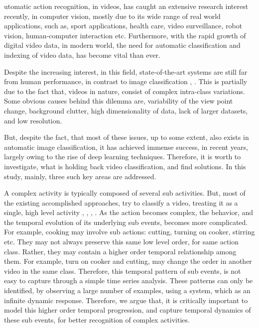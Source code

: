  utomatic action recognition, in videos, has caught an extensive research interest recently, 
in computer vision, mostly due to its wide range of real world applications, such as, 
sport applications, health care, video surveillance, robot vision, human-computer interaction
etc. Furthermore, with the rapid growth of digital video data, in modern world, 
the need for automatic
classification and indexing of video data, has become vital than ever. 

    


Despite the increasing interest, in this field, state-of-the-art
systems are still far from human performance, in contrast to image classification \cite{girshick2014rich},
 \cite{krizhevsky2012imagenet}. This is
partially due to the fact that, videos in nature, consist of complex intra-class variations. Some
obvious causes behind this dilemma are, variability of the view point change, background 
clutter, high dimensionality of data, lack of larger datasets, and low resolution. 

But, despite the fact, that most of these issues, up to some extent, also exists in 
automatic image classification, it has achieved immense success, in recent years,
largely owing to the rise of deep learning techniques. Therefore, it is worth to investigate,
what is holding back video classification, and find solutions. In this study, mainly, three such key
areas are addressed.

A complex activity is typically composed of several sub activities. 
But, most of the existing accomplished approaches, try to classify a video, treating it as a 
single, high level activity \cite{wang2011action}, \cite{wang2013action}, \cite{simonyan2014two}, 
\cite{7486474}.
As the action becomes complex, the behavior, and the 
temporal evolution of its underlying sub events, becomes more complicated. For example,
cooking may involve sub actions: cutting, turning on cooker, stirring etc. They may not always preserve this 
same low level order, for same action class. Rather, they may contain 
a higher order temporal relationship among them. For example, turn on cooker and cutting,
may change the order in another video in the same class. 
Therefore, this temporal pattern of sub events, is not easy to capture through a simple
time series analysis. These patterns can only be identified, by observing a large number
of examples, using a system, which as an infinite dynamic response. Therefore, we argue that, it is critically important to
model this higher order temporal
progression, and capture temporal dynamics of these sub events, for better recognition of
complex activities. 

